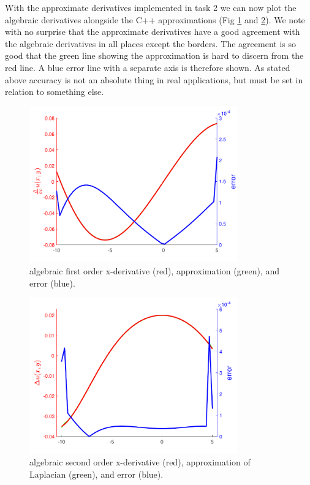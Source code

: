 \documentclass[paper=a4, fontsize=12pt]{article} %
\begin{document}
With the approximate derivatives implemented in task 2 we can now plot the algebraic derivatives alongside the C++ approximations (Fig \ref{fig:1derivX} and \ref{fig:2derivX}).
We note with no surprise that the approximate derivatives have a good agreement with the algebraic derivatives in all places except the borders. The agreement is so good that the green line showing the approximation is hard to discern from the red line. A blue error line with a separate axis is therefore shown. As stated above accuracy is not an absolute thing in real applications, but must be set in relation to something else.


\begin{figure}[H]
  \centering
  \includegraphics[width=0.8\textwidth]{comparison-x.pdf}
  \caption{\small algebraic first order x-derivative (red), approximation (green), and error (blue).\label{fig:1derivX}}
\end{figure}



\begin{figure}[H]
  \centering
  \includegraphics[width=0.8\textwidth]{comparison-xx.pdf}
  \caption{\small algebraic second order x-derivative (red), approximation of Laplacian (green), and error (blue).\label{fig:2derivX}}
\end{figure}
\end{document}
